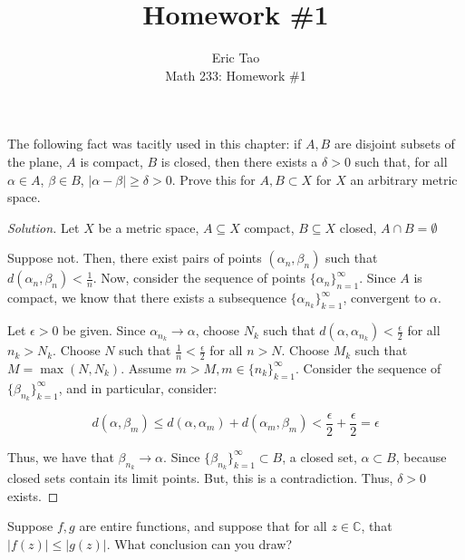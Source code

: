 \documentclass[10pt]{article}
\newenvironment{problem}[2][]{\begin{trivlist}
\item[\hskip \labelsep {\bfseries #1}\hskip \labelsep {\bfseries #2.}]}{\end{trivlist}}
\begin{document}
 
\title{Homework \#1}
\author{Eric Tao\\
Math 233: Homework \#1}
\maketitle

\begin{problem}{Question 1}
The following fact was tacitly used in this chapter: if $A, B$ are disjoint subsets of the plane, $A$ is compact, $B$ is closed, then there exists a $\delta > 0$ such that, for all $\alpha \in A$, $\beta \in B$, $| \alpha - \beta | \geq \delta > 0$. Prove this for $A, B \subset X$ for $X$ an arbitrary metric space. 

\end{problem}
\begin{proof}[Solution]

Let $X$ be a metric space, $A \subseteq X$ compact, $B \subseteq X$ closed, $A \cap B = \emptyset$

Suppose not. Then, there exist pairs of points $(\alpha_n, \beta_n)$ such that $d(\alpha_n,\beta_n) < \frac{1}{n}$. Now, consider the sequence of points $\{ \alpha_n \}_{n=1}^\infty$. Since $A$ is compact, we know that there exists a subsequence $\{ \alpha_{n_k} \}_{k=1}^\infty$, convergent to $\alpha$. 

Let $\epsilon > 0$ be given. Since $\alpha_{n_k} \to \alpha$, choose $N_k$ such that $d(\alpha, \alpha_{n_k}) < \frac{\epsilon}{2}$ for all $n_k > N_k$. Choose $N$ such that $\frac{1}{n} < \frac{\epsilon}{2}$ for all $n > N$. Choose $M_k$ such that $M = \max(N, N_k)$. Assume $m > M, m \in \{ n_k \}_{k=1}^\infty$. Consider the sequence of $\{ \beta_{n_k} \}_{k=1}^\infty$, and in particular, consider:

$$ d(\alpha, \beta_m) \leq d(\alpha, \alpha_m) + d(\alpha_m, \beta_m) < \frac{\epsilon}{2} + \frac{\epsilon}{2} = \epsilon$$

Thus, we have that $\beta_{n_k} \to \alpha$. Since $\{ \beta_{n_k} \}_{k=1}^\infty\subset B$, a closed set, $ \alpha \subset B$, because closed sets contain its limit points. But, this is a contradiction. Thus, $\delta > 0$ exists.
\end{proof}

\begin{problem}{Question 3}

Suppose $f, g$ are entire functions, and suppose that for all $z \in \mathbb{C}$, that $| f(z) | \leq | g(z)|$. What conclusion can you draw?

\end{problem}
\end{document}
